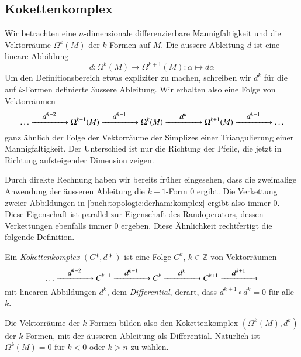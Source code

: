 %
%
\subsection{Kokettenkomplex}
Wir betrachten eine $n$-dimensionale differenzierbare Mannigfaltigkeit
und die Vektorräume $\Omega^k(M)$ der $k$-Formen auf $M$.
Die äussere Ableitung $d$ ist eine lineare Abbildung
\[
d
\colon
\Omega^k(M) \to \Omega^{k+1}(M)
:
\alpha \mapsto d\alpha
\]
Um den Definitionsbereich etwas expliziter zu machen, schreiben wir
$d^k$ für die auf $k$-Formen definierte äussere Ableitung.
Wir erhalten also eine Folge von Vektorräumen 
\begin{equation}
\dots
\xrightarrow{\qquad\clap{$d^{k-2}$}\qquad}
\Omega^{k-1}(M)
\xrightarrow{\qquad\clap{$d^{k-1}$}\qquad}
\Omega^k(M)
\xrightarrow{\qquad\clap{$d^{k}$}\qquad}
\Omega^{k+1}(M)
\xrightarrow{\qquad\clap{$d^{k+1}$}\qquad}
\dots
\label{buch:topologie:derham:komplex}
\end{equation}
ganz ähnlich der Folge der Vektorräume der Simplizes einer
Triangulierung einer Mannigfaltigkeit.
Der Unterschied ist nur die Richtung der Pfeile, die jetzt in
Richtung aufsteigender Dimension zeigen.

Durch direkte Rechnung haben wir bereits früher eingesehen, dass die
zweimalige Anwendung der äusseren Ableitung die $k+1$-Form 0 ergibt.
Die Verkettung zweier Abbildungen in \eqref{buch:topologie:derham:komplex}
ergibt also immer $0$.
Diese Eigenschaft ist parallel zur Eigenschaft des Randoperators,
dessen Verkettungen ebenfalls immer $0$ ergeben.
Diese Ähnlichkeit rechtfertigt die folgende Definition.

\begin{definition}[Kokettenkomplex]
%
Ein \emph{Kokettenkomplex} $(C*,d*)$ ist eine Folge $C^k$, $k\in\mathbb{Z}$
von Vektorräumen 
\[
\dots
\xrightarrow{\qquad\clap{$d^{k-2}$}\qquad}
C^{k-1}
\xrightarrow{\qquad\clap{$d^{k-1}$}\qquad}
C^k
\xrightarrow{\qquad\clap{$d^{k}$}\qquad}
C^{k+1}
\xrightarrow{\qquad\clap{$d^{k+1}$}\qquad}
\]
mit linearen Abbildungen $d^k$, dem \emph{Differential},
%
derart, dass $d^{k+1}\circ d^k=0$ für alle $k$.
\end{definition}

Die Vektorräume der $k$-Formen bilden also den Kokettenkomplex
$(\Omega^k(M),d^k)$ der $k$-Formen,
mit der äusseren Ableitung als Differential.
Natürlich ist $\Omega^k(M)=0$ für $k<0$ oder $k>n$ zu wählen.

%
%
